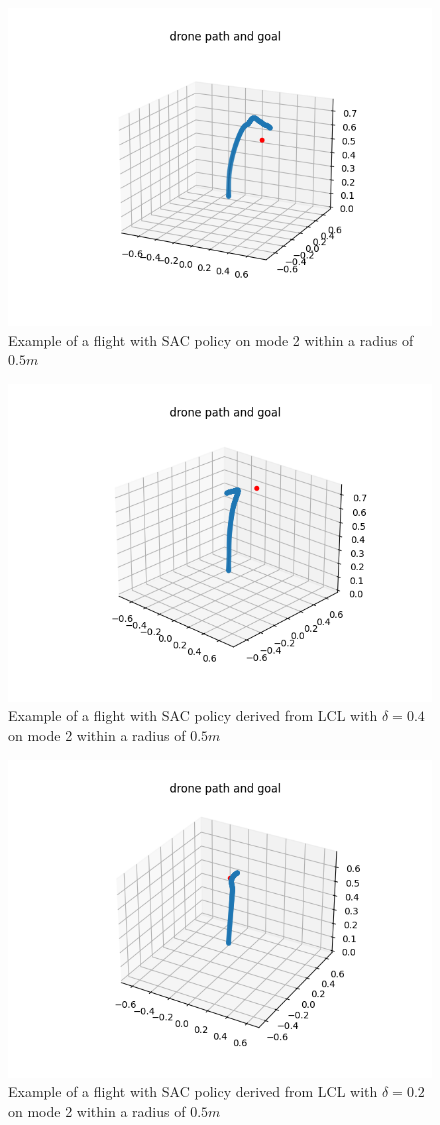\begin{figure}[htp]
	\centering
	\includegraphics[width=0.6\linewidth]{figures/exampleflight1.png}
	\caption{Example of a flight with SAC policy on mode 2 within a radius of $0.5m$}
	\label{fig:flight0}
\end{figure}

\begin{figure}[htp]
	\centering
	\includegraphics[width=0.6\linewidth]{figures/flight2.png}
	\caption{Example of a flight with SAC policy derived from LCL with $\delta = 0.4$ on mode 2 within a radius of $0.5m$}
	\label{fig:flight1}
\end{figure}

\begin{figure}[htp]
	\centering
	\includegraphics[width=0.6\linewidth]{figures/flight3.png}
	\caption{Example of a flight with SAC policy derived from LCL with $\delta = 0.2$ on mode 2 within a radius of $0.5m$}
	\label{fig:flight2}
\end{figure}

